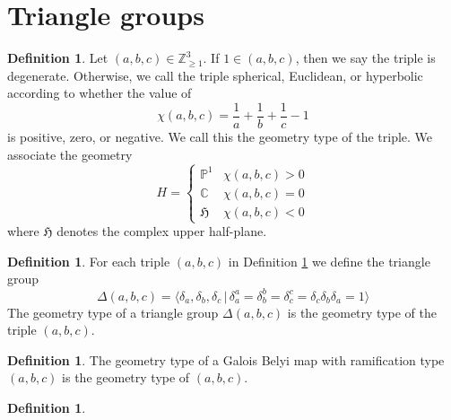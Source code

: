 \documentclass{dcthesis}
\newcommand{\PP}{\mathbb P}
\newcommand{\CC}{\mathbb C}
\newcommand{\ZZ}{\mathbb Z}
\newcommand{\defi}[1]{\textsf{#1}}
\numberwithin{equation}{section}
\theoremstyle{definition}
\newtheorem{definition}[equation]{Definition}
\theoremstyle{remark}
\begin{document}
{{  \section{Triangle groups}{\label{sec:trianglegroups}
    \begin{definition}
      \label{def:geometrytype}
      Let $(a,b,c)\in\ZZ_{\geq 1}^3$.
      If $1\in(a,b,c)$, then we say the triple is \defi{degenerate}.
      Otherwise, we call the triple
      \defi{spherical},
      \defi{Euclidean},
      or \defi{hyperbolic}
      according to whether the value of
      \begin{equation}
        \label{eqn:eulerchar}
        \chi(a,b,c) = \frac{1}{a}+\frac{1}{b}
        +\frac{1}{c}-1
      \end{equation}
      is positive, zero, or negative.
      We call this the \defi{geometry type}
      of the triple.
      We associate the \defi{geometry}
      \begin{equation}
        \label{eqn:geometrytype}
        H=
        \begin{cases}
          \PP^1&\chi(a,b,c)>0\\
          \CC&\chi(a,b,c)=0\\
          \mathfrak{H}&\chi(a,b,c)<0
        \end{cases}
      \end{equation}
      where $\mathfrak{H}$ denotes the complex upper half-plane.
    \end{definition}
    \begin{definition}
      \label{def:trianglegroup}
      For each triple $(a,b,c)$ in Definition \ref{def:geometrytype}
      we define the \defi{triangle group}
      \begin{equation}
        \label{eqn:trianglegroup}
        \Delta(a,b,c)
        =
        \langle
        \delta_a, \delta_b, \delta_c \,|\,
        \delta_a^a=\delta_b^b=\delta_c^c=\delta_c\delta_b\delta_a=1
        \rangle
      \end{equation}
      The \defi{geometry type}
      of a triangle group $\Delta(a,b,c)$
      is the geometry type of the triple $(a,b,c)$.
    \end{definition}
    \begin{definition}\label{def:geometrytypeofbelyimap}
      The \defi{geometry type} of a Galois Belyi map
      with ramification type $(a,b,c)$
      is the geometry type of $(a,b,c)$.
    \end{definition}
    \begin{definition}\label{def:geometrytypeofpermutationtriple}

\end{definition}}}}
\end{document}
